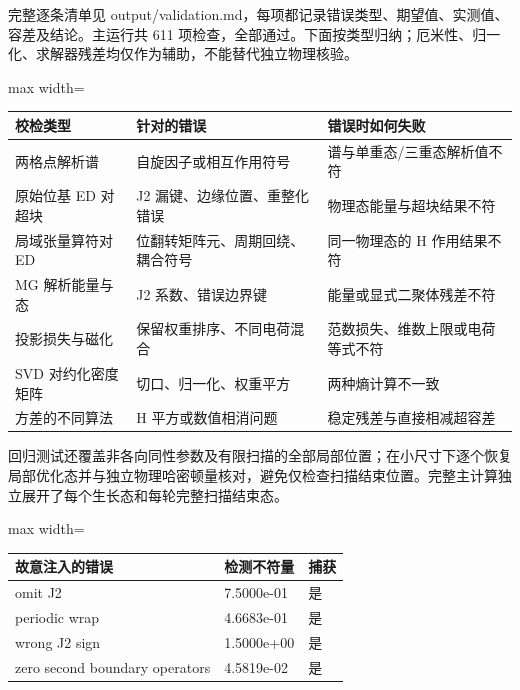 \documentclass[zihao=5,a4paper]{ctexart}
\begin{document}
完整逐条清单见 output/validation.md，每项都记录错误类型、期望值、实测值、容差及结论。主运行共 611 项检查，全部通过。下面按类型归纳；厄米性、归一化、求解器残差均仅作为辅助，不能替代独立物理核验。


\begin{center}
\small
\begin{adjustbox}{max width=\linewidth}
\begin{tabular}{lll}
\toprule
校检类型 & 针对的错误 & 错误时如何失败 \\
\midrule
两格点解析谱 & 自旋因子或相互作用符号 & 谱与单重态/三重态解析值不符 \\
原始位基 ED 对超块 & J2 漏键、边缘位置、重整化错误 & 物理态能量与超块结果不符 \\
局域张量算符对 ED & 位翻转矩阵元、周期回绕、耦合符号 & 同一物理态的 H 作用结果不符 \\
MG 解析能量与态 & J2 系数、错误边界键 & 能量或显式二聚体残差不符 \\
投影损失与磁化 & 保留权重排序、不同电荷混合 & 范数损失、维数上限或电荷等式不符 \\
SVD 对约化密度矩阵 & 切口、归一化、权重平方 & 两种熵计算不一致 \\
方差的不同算法 & H 平方或数值相消问题 & 稳定残差与直接相减超容差 \\
\bottomrule
\end{tabular}
\end{adjustbox}
\end{center}

回归测试还覆盖非各向同性参数及有限扫描的全部局部位置；在小尺寸下逐个恢复局部优化态并与独立物理哈密顿量核对，避免仅检查扫描结束位置。完整主计算独立展开了每个生长态和每轮完整扫描结束态。


\begin{center}
\small
\begin{adjustbox}{max width=\linewidth}
\begin{tabular}{lll}
\toprule
故意注入的错误 & 检测不符量 & 捕获 \\
\midrule
omit J2 & 7.5000e-01 & 是 \\
periodic wrap & 4.6683e-01 & 是 \\
wrong J2 sign & 1.5000e+00 & 是 \\
zero second boundary operators & 4.5819e-02 & 是 \\
\bottomrule
\end{tabular}
\end{adjustbox}
\end{center}
\end{document}
